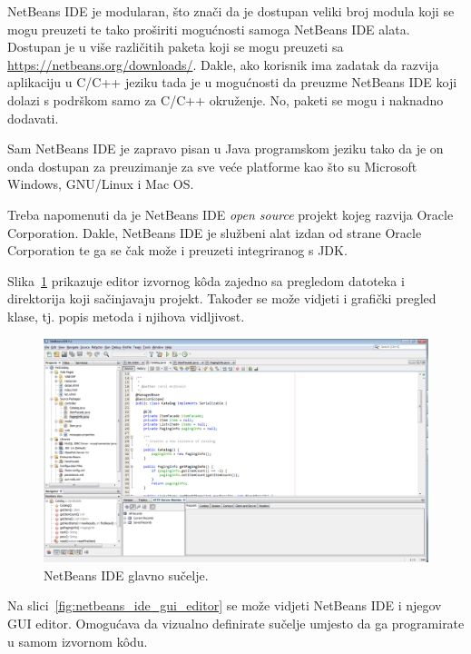 NetBeans IDE je modularan, što znači da je dostupan veliki broj modula koji se mogu preuzeti te tako proširiti mogućnosti samoga NetBeans IDE alata. Dostupan je u više različitih paketa koji se mogu preuzeti sa \url{https://netbeans.org/downloads/}. Dakle, ako korisnik ima zadatak da razvija aplikaciju u C/C++ jeziku tada je u mogućnosti da preuzme NetBeans IDE koji dolazi s podrškom samo za C/C++ okruženje. No, paketi se mogu i naknadno dodavati.

Sam NetBeans IDE je zapravo pisan u Java programskom jeziku tako da je on onda dostupan za preuzimanje za sve veće platforme kao što su Microsoft Windows, GNU/Linux i Mac OS.

Treba napomenuti da je NetBeans IDE \emph{open source} projekt kojeg razvija Oracle Corporation. Dakle, NetBeans IDE je službeni alat izdan od strane Oracle Corporation te ga se čak može i preuzeti integriranog s JDK.

Slika~\ref{fig:netbeans_ide_overview} prikazuje editor izvornog kôda zajedno sa pregledom datoteka i direktorija koji sačinjavaju projekt. Također se može vidjeti i grafički pregled klase, tj. popis metoda i njihova vidljivost.

\begin{figure}[h!]
    \caption{NetBeans IDE glavno sučelje.}
    \label{fig:netbeans_ide_overview}
    \centering
    \includegraphics[max width=\textwidth]{images/netbeans_ide_overview.png}
\end{figure}

Na slici~\ref{fig:netbeans_ide_gui_editor} se može vidjeti NetBeans IDE i njegov GUI editor. Omogućava da vizualno definirate sučelje umjesto da ga programirate u samom izvornom kôdu.

